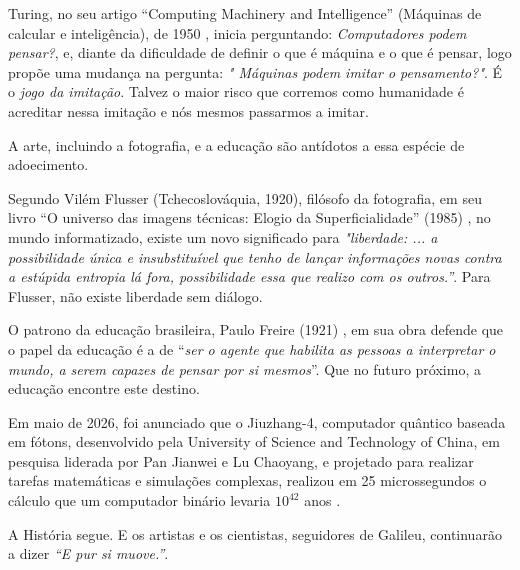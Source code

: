 \documentclass{hipatia}
\begin{document}
	Turing, no seu artigo ``Computing Machinery and Intelligence'' (Máquinas de calcular e inteligência), de 1950 \cite{Turing1950}, inicia perguntando: \textit{Computadores podem pensar?}, e, diante da dificuldade de definir o que é máquina e o que é pensar, logo propõe uma mudança na pergunta: \textit{" Máquinas podem imitar o pensamento?"}. É o \textit{jogo da imitação}.
	Talvez o maior risco que corremos como humanidade é acreditar nessa imitação e nós mesmos passarmos a imitar. 	
    
    A arte, incluindo a fotografia, e a educação são antídotos a essa espécie de adoecimento.

	Segundo Vilém Flusser (Tchecoslováquia, 1920), filósofo da fotografia, em seu livro ``O universo das imagens técnicas: Elogio da Superficialidade'' (1985) \cite{Flusser2008}, no mundo informatizado, existe um novo significado para \textit{"liberdade: ... a possibilidade única e insubstituível que tenho de lançar informações novas contra a estúpida entropia lá fora, possibilidade essa que realizo com os outros.''}.
Para Flusser, não existe liberdade sem diálogo.

O patrono da educação brasileira, Paulo Freire (1921) \cite{Freire1987}, em sua obra defende que o papel da educação é a de ``\textit{ser o agente que habilita as pessoas a interpretar o mundo, a serem capazes de pensar por si mesmos}''. Que no futuro próximo, a educação encontre este destino.




Em maio de 2026, foi anunciado que o Jiuzhang-4, computador quântico baseada em fótons, desenvolvido pela University of Science and Technology of China, em pesquisa liderada por Pan Jianwei e Lu Chaoyang, e projetado para realizar tarefas matemáticas e simulações complexas, realizou em 25 microssegundos o cálculo que um computador binário levaria $10^{42}$ anos \cite{CAS2026}.

A História segue. E os artistas e os cientistas, seguidores de Galileu, continuarão a dizer \textit{``E pur si muove.''}.


\nocite{*}

%
\end{document}
